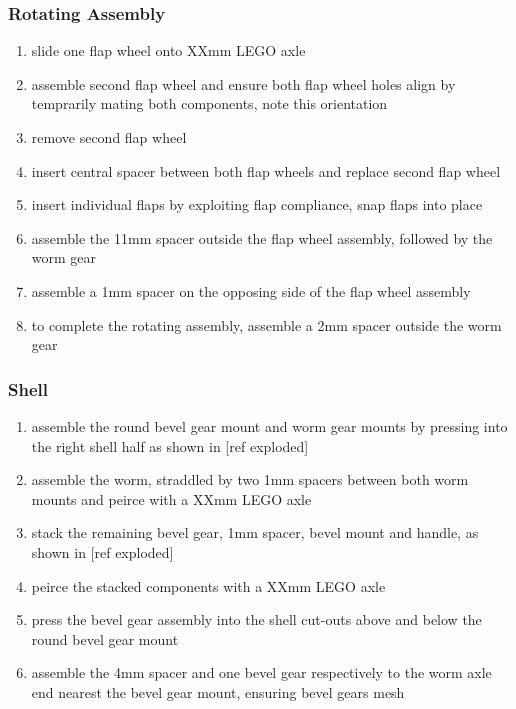 \documentclass[11pt]{article}
\begin{document}
\subsubsection{Rotating Assembly}
\label{sec:org744138d}
\begin{enumerate}
\item slide one flap wheel onto XXmm LEGO axle
\item assemble second flap wheel and ensure both flap wheel holes align by temprarily mating both components, note this orientation
\item remove second flap wheel
\item insert central spacer between both flap wheels and replace second flap wheel
\item insert individual flaps by exploiting flap compliance, snap flaps into place
\item assemble the 11mm spacer outside the flap wheel assembly, followed by the worm gear
\item assemble a 1mm spacer on the opposing side of the flap wheel assembly
\item to complete the rotating assembly, assemble a 2mm spacer outside the worm gear
\end{enumerate}

\subsubsection{Shell}
\label{sec:orgbea2bad}
\begin{enumerate}
\item assemble the round bevel gear mount and worm gear mounts by pressing into the right shell half as shown in [ref exploded]
\item assemble the worm, straddled by two 1mm spacers between both worm mounts and peirce with a XXmm LEGO axle
\item stack the remaining bevel gear, 1mm spacer, bevel mount and handle, as shown in [ref exploded]
\item peirce the stacked components with a XXmm LEGO axle
\item press the bevel gear assembly into the shell cut-outs above and below the round bevel gear mount
\item assemble the 4mm spacer and one bevel gear respectively to the worm axle end nearest the bevel gear mount, ensuring bevel gears mesh
\end{enumerate}
\end{document}
